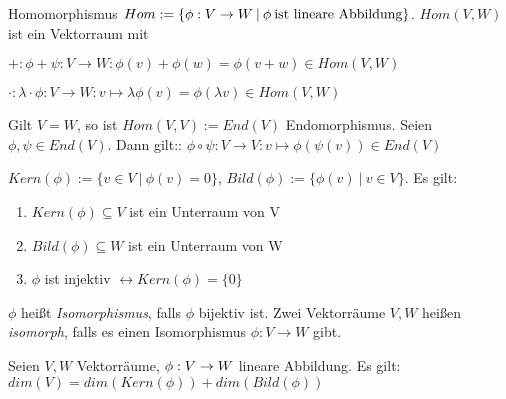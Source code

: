 \begin{definition}
	Homomorphismus $Hom := \{\phi : V \rightarrow W \medspace | \medspace \phi \medspace \textnormal{ist lineare Abbildung}\}$.  $Hom(V,W)$ ist ein Vektorraum mit
	\begin{description}[noitemsep]
		\item $+ : \phi + \psi : V \rightarrow W : \phi(v) + \phi(w) = \phi(v + w) \in Hom(V,W)$
		\item $\cdot : \lambda \cdot \phi : V \rightarrow W : v \mapsto \lambda \phi(v) = \phi(\lambda v) \in Hom(V,W)$
	\end{description}

	Gilt $V = W$, so ist $Hom(V,V) := End(V)$ Endomorphismus. Seien $\phi, \psi \in End(V)$. Dann gilt:: $\phi \circ \psi : V \rightarrow V : v \mapsto \phi(\psi(v)) \in End(V)$
\end{definition}

\begin{definition}
	$Kern(\phi) := \{v \in V \medspace | \medspace \phi(v) = 0\}$, $Bild(\phi) := \{\phi(v) \medspace | \medspace v \in V\}$. 
		Es gilt:	

	\begin{enumerate}[noitemsep]
		\item $Kern(\phi) \subseteq V$ ist ein Unterraum von V
		\item $Bild(\phi) \subseteq W$ ist ein Unterraum von W
		\item $\phi$ ist injektiv $\leftrightarrow Kern(\phi) = \{0\}$
	\end{enumerate}
\end{definition}

\begin{definition}[Isomorphismus]
	$\phi$ heißt \emph{Isomorphismus}, falls $\phi$ bijektiv ist. Zwei Vektorräume $V,W$ heißen \emph{isomorph}, falls es einen Isomorphismus $\phi : V \rightarrow W$ gibt.
\end{definition}

\begin{satz}[Dimensionssatz]
	Seien $V,W$ Vektorräume, $\phi : V \rightarrow W$ lineare Abbildung. Es gilt: $dim(V) = dim(Kern(\phi)) + dim(Bild(\phi))$
\end{satz}

